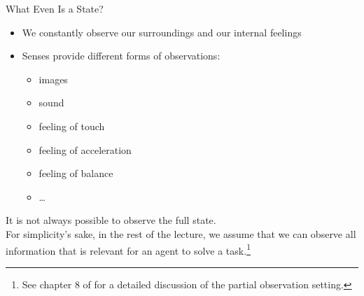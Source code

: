 \documentclass[main]{subfiles}
\begin{document}
\begin{frame}{What Even Is a State?}
    \begin{itemize}
        \item We constantly observe our surroundings and our internal feelings
        \item Senses provide different forms of observations:
        \begin{itemize}
            \item images
            \item sound
            \item feeling of touch
            \item feeling of acceleration
            \item feeling of balance
            \item \ldots
        \end{itemize}
    \end{itemize}
    It is not always possible to observe the full state.\\
    For simplicity's sake, in the rest of the lecture, we assume that we can observe all information that is relevant for an agent to solve a task.\footnote{See chapter 8 of  for a detailed discussion of the partial observation setting.}
\end{frame}
\end{document}
